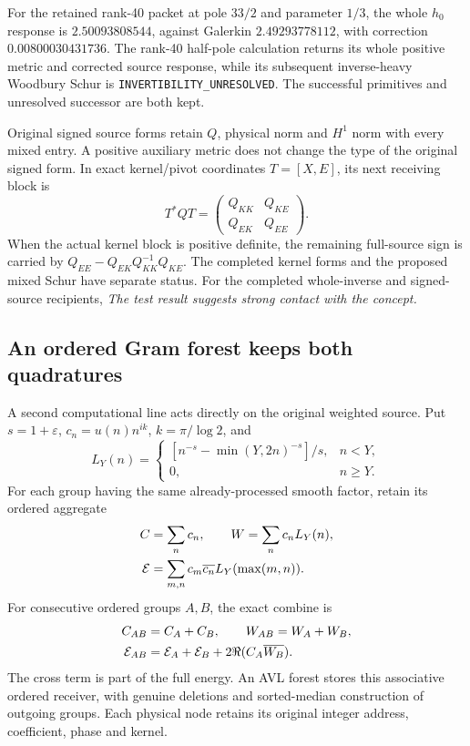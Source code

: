 For the retained rank-40 packet at pole \(33/2\) and parameter \(1/3\),
the whole \(h_0\) response is \(2.50093808544\), against Galerkin
\(2.49293778112\), with correction \(0.00800030431736\).
The rank-40 half-pole calculation returns its whole positive metric
and corrected source response, while its subsequent inverse-heavy
Woodbury Schur is \texttt{INVERTIBILITY\_UNRESOLVED}.
The successful primitives and unresolved successor are both kept.

Original signed source forms retain \(Q\), physical norm and \(H^1\)
norm with every mixed entry. A positive auxiliary metric does not
change the type of the original signed form. In exact kernel/pivot
coordinates \(T=[X,E]\), its next receiving block is
\[
 T^*QT=
 \begin{pmatrix}Q_{KK}&Q_{KE}\\Q_{EK}&Q_{EE}\end{pmatrix}.
\]
When the actual kernel block is positive definite, the remaining
full-source sign is carried by
\(Q_{EE}-Q_{EK}Q_{KK}^{-1}Q_{KE}\).
The completed kernel forms and the proposed mixed Schur have separate
status. For the completed whole-inverse and signed-source recipients,
\emph{The test result suggests strong contact with the concept.}

\subsection{An ordered Gram forest keeps both quadratures}

A second computational line acts directly on the original weighted
source. Put \(s=1+\varepsilon\),
\(c_n=u(n)n^{ik}\), \(k=\pi/\log2\), and
\[
 L_Y(n)=
 \begin{cases}
 [n^{-s}-\min(Y,2n)^{-s}]/s,&n<Y,\\
 0,&n\geq Y.
 \end{cases}
\]
For each group having the same already-processed smooth factor,
retain its ordered aggregate
\[
\begin{aligned}
 C&=\sum_nc_n,\qquad W=\sum_nc_nL_Y(n),\\
 {\cal E}&=\sum_{m,n}c_m\overline{c_n}
                  L_Y(\max(m,n)).
\end{aligned}
\]
For consecutive ordered groups \(A,B\), the exact combine is
\[
\begin{aligned}
 C_{AB}&=C_A+C_B,\qquad W_{AB}=W_A+W_B,\\
 {\cal E}_{AB}&={\cal E}_A+{\cal E}_B
                    +2\Re(C_A\overline{W_B}).
\end{aligned}
\]
The cross term is part of the full energy. An AVL forest stores this
associative ordered receiver, with genuine deletions and sorted-median
construction of outgoing groups. Each physical node retains its
original integer address, coefficient, phase and kernel.

